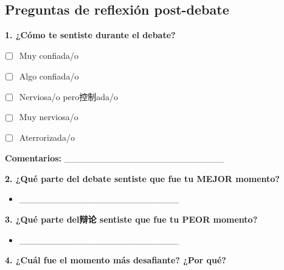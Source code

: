 \documentclass[a4paper,11pt]{article}
\begin{document}
\vspace{0.2cm}

\subsection{Preguntas de reflexión post-debate}

\vspace{0.2cm}

\textbf{1. ¿Cómo te sentiste durante el debate?}

\begin{itemize}

  \item ☐ Muy confiada/o

  \item ☐ Algo confiada/o

  \item ☐ Nerviosa/o pero控制ada/o

  \item ☐ Muy nerviosa/o

  \item ☐ Aterrorizada/o

\end{itemize}

\vspace{0.2cm}

\textbf{Comentarios:} _________________________

\vspace{0.2cm}

\textbf{2. ¿Qué parte del debate sentiste que fue tu MEJOR momento?}

\begin{itemize}

  \item _________________________

\end{itemize}

\vspace{0.2cm}

\textbf{3. ¿Qué parte del辩论 sentiste que fue tu PEOR momento?}

\begin{itemize}

  \item _________________________

\end{itemize}

\vspace{0.2cm}

\textbf{4. ¿Cuál fue el momento más desafiante? ¿Por qué?}
\end{document}

